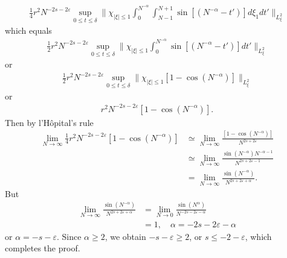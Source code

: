 \documentclass[12pt,reqno]{amsart}
\numberwithin{equation}{section}  %
\newcommand{\ee}{\varepsilon}
\begin{document}
%
%
%
%
\begin{equation*}
\begin{split}
  \frac{1}{4} r^{2}N^{-2s - 2\ee} \sup_{0 \le t \le \delta} \|\chi_{| \xi |\le 1} 
  \int_{0}^{N^{-\alpha}} \int_{N-1}^{N+1} \sin[(N^{-\alpha}-t')] d
  \xi_{1} dt' \|_{L^{2}_{\xi}}
\end{split}
\end{equation*}
%
%
which equals
%
%
%
\begin{equation*}
\begin{split}
  \frac{1}{2} r^{2}N^{-2s - 2\ee} \sup_{0 \le t \le \delta} \|\chi_{| \xi |\le 1} 
  \int_{0}^{N^{-\alpha}} \sin[(N^{-\alpha}-t')] dt' \|_{L^{2}_{\xi}}
\end{split}
\end{equation*}
%
%
or
%
\begin{equation*}
\begin{split}
  \frac{1}{2} r^{2}N^{-2s - 2\ee} \sup_{0 \le t \le \delta} \|\chi_{| \xi |\le 1} 
  [1 - \cos(N^{-\alpha})] \|_{L^{2}_{\xi}}
\end{split}
\end{equation*}
%
%
or
%
\begin{equation*}
\begin{split}
r^{2} N^{-2s - 2\ee}  
[1 - \cos(N^{-\alpha})].
\end{split}
\end{equation*}
%
%
Then by l'H\^opital's rule
%
%
\begin{equation*}
\begin{split}
  \lim_{N \to \infty} \frac{1}{4} r^{2} N^{-2s - 2\ee}  
[1 - \cos(N^{-\alpha})]
& \simeq \lim_{N \to \infty} \frac{[1 - \cos(N^{-\alpha})]}{N^{2s + 2\ee}}
\\
& \simeq \lim_{N \to \infty}  \frac{\sin(N^{-\alpha}) N^{-\alpha -1}}{N^{2s+ 2
\ee -1}}
\\
& = \lim_{N \to \infty} \frac{\sin(N^{-\alpha})}{N^{2s + 2\ee + \alpha}}.
\end{split}
\end{equation*}
%
%
But
%
%
\begin{equation*}
\begin{split}
  \lim_{N \to \infty} \frac{\sin(N^{-\alpha})}{N^{2s + 2\ee + \alpha}}
  & = \lim_{N \to 0}\frac{\sin(N^{\alpha})}{N^{-2s - 2 \ee - \alpha}}
  \\
  & = 1, \quad \alpha = -2s - 2\ee - \alpha
\end{split}
\end{equation*}
%
%
or $\alpha = -s -\ee $. Since $\alpha \ge 2$, we obtain
%
%
$-s - \ee \ge 2$, or $s \le -2 - \ee$, which completes the proof.
\qquad \qedsymbol
%
%
%
%
%
%
%
%
%
%
\end{document}
